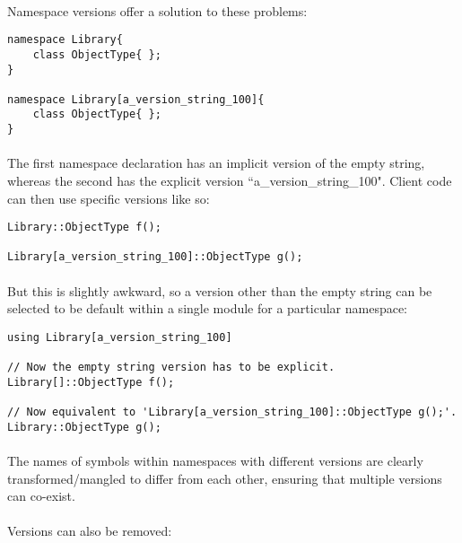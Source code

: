 \documentclass[12pt,twoside,notitlepage]{report}
\begin{document}
\paragraph{}
Namespace versions offer a solution to these problems:

\begin{lstlisting}
namespace Library{
	class ObjectType{ };
}

namespace Library[a_version_string_100]{
	class ObjectType{ };
}
\end{lstlisting}

\paragraph{}
The first namespace declaration has an implicit version of the empty string, whereas the second has the explicit version ``a\_version\_string\_100". Client code can then use specific versions like so:

\begin{lstlisting}
Library::ObjectType f();

Library[a_version_string_100]::ObjectType g();
\end{lstlisting}

\paragraph{}
But this is slightly awkward, so a version other than the empty string can be selected to be default within a single module for a particular namespace:

\begin{lstlisting}
using Library[a_version_string_100]

// Now the empty string version has to be explicit.
Library[]::ObjectType f();

// Now equivalent to 'Library[a_version_string_100]::ObjectType g();'.
Library::ObjectType g();
\end{lstlisting}

\paragraph{}
The names of symbols within namespaces with different versions are clearly transformed/mangled to differ from each other, ensuring that multiple versions can co-exist.

\paragraph{}
Versions can also be removed:
\end{document}
